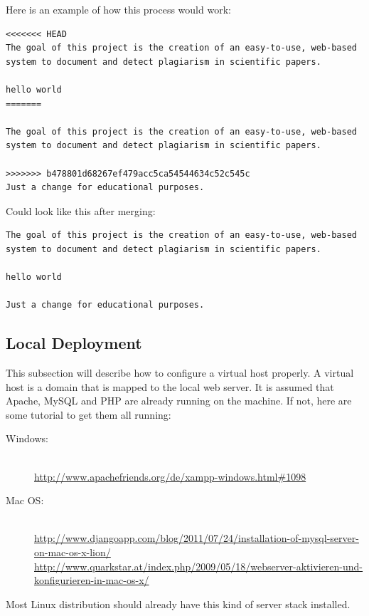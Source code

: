 Here is an example of how this process would work:

\begin{lstlisting}[caption=Conflicted file, keywordstyle=\color{black}]
<<<<<<< HEAD
The goal of this project is the creation of an easy-to-use, web-based
system to document and detect plagiarism in scientific papers.

hello world
=======

The goal of this project is the creation of an easy-to-use, web-based
system to document and detect plagiarism in scientific papers.

>>>>>>> b478801d68267ef479acc5ca54544634c52c545c
Just a change for educational purposes.
\end{lstlisting}

Could look like this after merging:


\begin{lstlisting}[caption=Fixed conflict after merging, keywordstyle=\color{black}]
The goal of this project is the creation of an easy-to-use, web-based
system to document and detect plagiarism in scientific papers.

hello world

Just a change for educational purposes.
\end{lstlisting}

\subsection{Local Deployment}

This subsection will describe how to configure a virtual host properly. A virtual host is a domain that is mapped to 
the local web server. It is assumed that Apache, MySQL and PHP are already running on the machine. If not, here are 
some tutorial to get them all running:

\begin{description}
\item [Windows:] \hfill \\
 \url{http://www.apachefriends.org/de/xampp-windows.html#1098}
\item [Mac OS:] \hfill \\
\url{http://www.djangoapp.com/blog/2011/07/24/installation-of-mysql-server-on-mac-os-x-lion/} 
\url{http://www.quarkstar.at/index.php/2009/05/18/webserver-aktivieren-und-konfigurieren-in-mac-os-x/}
\end{description}

Most Linux distribution should already have this kind of server stack installed.

